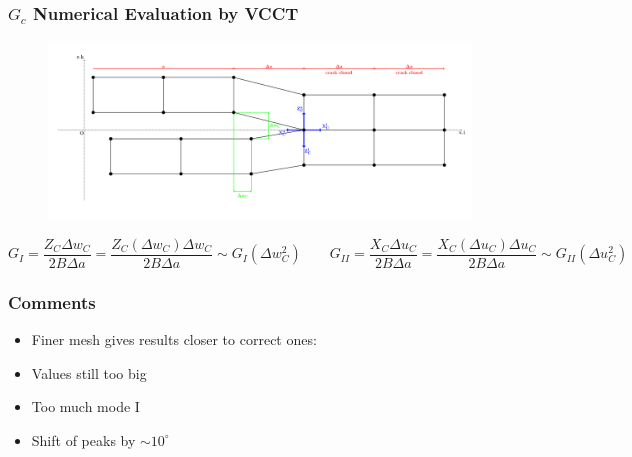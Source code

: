 \documentclass[first,firstsupp,lastsupp,handout,last,hyperref,table]{ETHclass}
\begin{document}
\begin{frame}
\frametitle{$G_{c}$ Numerical Evaluation by VCCT}
\vspace{-1.5cm}
\tiny
\centering
\begin{figure}[!h]
\centering
\includegraphics[height=0.6\textheight]{VCCT.pdf}
  \label{fig:vcct}
\end{figure}
\begin{equation*}
G_{I}=\frac{Z_{C}\Delta w_{C}}{2B\Delta a}=\frac{Z_{C}\left(\Delta w_{C}\right)\Delta w_{C}}{2B\Delta a}\sim G_{I}\left(\Delta w_{C}^{2}\right)\qquad G_{II}=\frac{X_{C}\Delta u_{C}}{2B\Delta a}=\frac{X_{C}\left(\Delta u_{C}\right)\Delta u_{C}}{2B\Delta a}\sim G_{II}\left(\Delta u_{C}^{2}\right)
\end{equation*}
\end{frame}


\begin{frame}
\frametitle{Comments}
\vspace{-0.25cm}
\small
\begin{itemize}[label=]
\item Finer mesh gives results closer to correct ones:
\item Values still too big
\item Too much mode I
\item Shift of peaks by $\sim10^{\circ}$
\end{itemize}
\end{frame}
\end{document}
